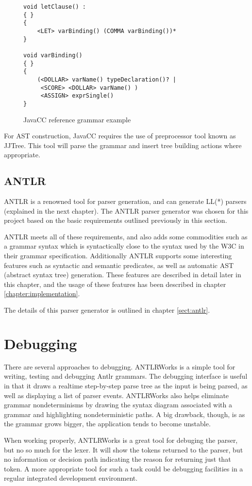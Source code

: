 \begin{figure}[h!]
\begin{Verbatim}
void letClause() :
{ }
{
    <LET> varBinding() (COMMA varBinding())*
} 

void varBinding()
{ }
{
    (<DOLLAR> varName() typeDeclaration()? | 
     <SCORE> <DOLLAR> varName() )
     <ASSIGN> exprSingle()
}
\end{Verbatim}
\caption{ JavaCC reference grammar example }
\label{code:parsers:javacc}
\end{figure}

For AST construction, JavaCC requires the use of preprocessor tool known as  
JJTree. This tool will parse the grammar and insert tree building actions where
appropriate. 

\subsection{ANTLR}
ANTLR is a renowned tool for parser generation, and can generate LL(*) parsers
(explained in the next chapter). The ANTLR parser generator was chosen for this
project based on the basic requirements outlined previously in this section.  

ANTLR meets all of these requirements, and also adds some commodities such as a
grammar syntax which is syntactically close to the syntax used by the W3C in
their grammar specification\cite{w3c01}. Additionally ANTLR supports some
interesting features such as syntactic and semantic predicates, as well as
automatic AST (abstract syntax tree) generation. These features are described in
detail later in this chapter, and the usage of these features has been described
in chapter \ref{chapter:implementation}.

The details of this parser generator is outlined in chapter \ref{sect:antlr}.

\section{Debugging}
\label{sect:method:debugging}
There are several approaches to debugging. ANTLRWorks \cite{antlrwrks00} is a
simple tool for writing, testing and debugging Antlr grammars. The debugging
interface is useful in that it draws a realtime step-by-step parse tree as the
input is being parsed, as well as displaying a list of parser events.
ANTLRWorks also helps eliminate grammar nondeterminisms by drawing the syntax
diagram associated with a grammar and highlighting nondeterministic paths. A
big drawback, though, is as the grammar grows bigger, the application tends to
become unstable.    

When working properly, ANTLRWorks is a great tool for debuging the parser, but
no so much for the lexer. It will show the tokens returned to the parser, but
no information or decision path indicating the reason for returning just that
token. A more appropriate tool for such a task could be debugging facilities in
a regular integrated development environment. %
